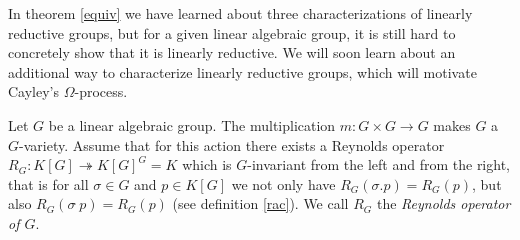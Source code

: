 In theorem \ref{equiv} we have learned about three characterizations of linearly reductive groups, but for a given linear algebraic group, it is still hard to concretely show that it is linearly reductive.
We will soon learn about an additional way to characterize linearly reductive groups, which will motivate Cayley's $\Omega$-process.

\begin{definition}\label{rengr}
  Let $G$ be a linear algebraic group.
  The multiplication $m \colon G\times G \rightarrow G$ makes $G$ a $G$-variety.
  Assume that for this action there exists a Reynolds operator $R_G \colon K[G] \twoheadrightarrow K[G]^G = K$ which is $G$-invariant from the left and from the right, that is for all $\sigma \in G$ and $p \in K[G]$ we not only have $R_G(\sigma.p)=R_G(p)$, but also $R_G(\sigma\dot{\phantom{.}}p)=R_G(p)$ (see definition \ref{rac}).
  We call $R_G$ the \textit{Reynolds operator of $G$}.
\end{definition}



